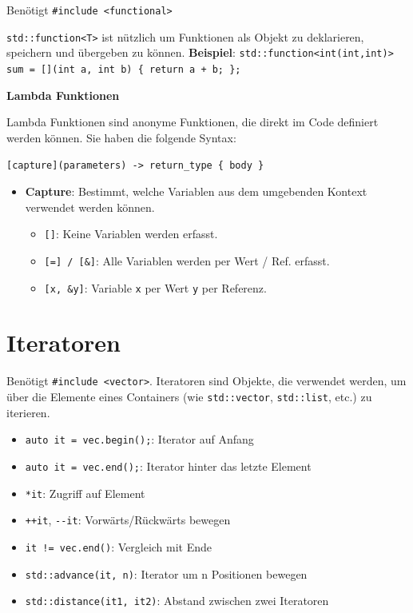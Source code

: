 \documentclass[8pt, landscape]{article}
\newcommand{\algo}[1]{\textbf{\textcolor{blue!60!black}{#1}}}
\newcommand{\datastruct}[1]{\textbf{\textcolor{red!60!black}{#1}}}
\begin{document}
\begin{multicols*}{4}
Benötigt \lstinline|#include <functional>|

\lstinline|std::function<T>| ist nützlich um Funktionen als Objekt zu deklarieren, speichern und übergeben zu können. \algo{Beispiel}:
\lstinline|std::function<int(int,int)> sum = [](int a, int b) { return a + b; };|

\datastruct{Lambda Funktionen}

Lambda Funktionen sind anonyme Funktionen, die direkt im Code definiert werden können. Sie haben die folgende Syntax:

\lstinline|[capture](parameters) -> return_type { body }|

\begin{itemize}
    \item \textbf{Capture}: Bestimmt, welche Variablen aus dem umgebenden Kontext verwendet werden können.
    \begin{itemize}
        \item \lstinline|[]|: Keine Variablen werden erfasst.
        \item \lstinline|[=] / [&]|: Alle Variablen werden per Wert / Ref. erfasst.
        \item \lstinline|[x, &y]|: Variable \lstinline|x| per Wert \lstinline|y| per Referenz.
    \end{itemize}
\end{itemize}

\section{Iteratoren}
Benötigt \lstinline|#include <vector>|. 
Iteratoren sind Objekte, die verwendet werden, um über die Elemente eines Containers (wie \lstinline|std::vector|, \lstinline|std::list|, etc.) zu iterieren. 
\begin{itemize}
    \item \lstinline|auto it = vec.begin();|: Iterator auf Anfang
    \item \lstinline|auto it = vec.end();|: Iterator hinter das letzte Element
    \item \lstinline|*it|: Zugriff auf Element
    \item \lstinline|++it|, \lstinline|--it|: Vorwärts/Rückwärts bewegen
    \item \lstinline|it != vec.end()|: Vergleich mit Ende
    \item \lstinline|std::advance(it, n)|: Iterator um n Positionen bewegen
    \item \lstinline|std::distance(it1, it2)|: Abstand zwischen zwei Iteratoren
\end{itemize}



\end{multicols*}
\end{document}
